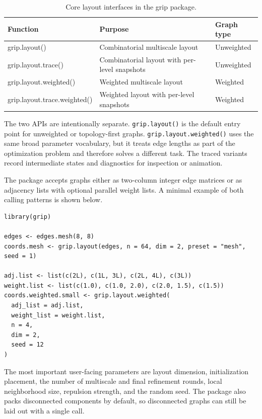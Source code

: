 \begin{table}

\caption{\label{tab:api-summary}Core layout interfaces in the grip package.}
\centering
\begin{tabular}[t]{l|l|l}
\hline
Function & Purpose & Graph type\\
\hline
grip.layout() & Combinatorial multiscale layout & Unweighted\\
\hline
grip.layout.trace() & Combinatorial layout with per-level snapshots & Unweighted\\
\hline
grip.layout.weighted() & Weighted multiscale layout & Weighted\\
\hline
grip.layout.trace.weighted() & Weighted layout with per-level snapshots & Weighted\\
\hline
\end{tabular}
\end{table}

The two APIs are intentionally separate. \texttt{grip.layout()} is the default entry
point for unweighted or topology-first graphs. \texttt{grip.layout.weighted()} uses
the same broad parameter vocabulary, but it treats edge lengths as part of the
optimization problem and therefore solves a different task. The traced variants
record intermediate states and diagnostics for inspection or animation.

The package accepts graphs either as two-column integer edge matrices or as
adjacency lists with optional parallel weight lists. A minimal example of both
calling patterns is shown below.

\begin{verbatim}
library(grip)

edges <- edges.mesh(8, 8)
coords.mesh <- grip.layout(edges, n = 64, dim = 2, preset = "mesh", seed = 1)

adj.list <- list(c(2L), c(1L, 3L), c(2L, 4L), c(3L))
weight.list <- list(c(1.0), c(1.0, 2.0), c(2.0, 1.5), c(1.5))
coords.weighted.small <- grip.layout.weighted(
  adj_list = adj.list,
  weight_list = weight.list,
  n = 4,
  dim = 2,
  seed = 12
)
\end{verbatim}

The most important user-facing parameters are layout dimension, initialization
placement, the number of multiscale and final refinement rounds, local
neighborhood size, repulsion strength, and the random seed. The package also
packs disconnected components by default, so disconnected graphs can still be
laid out with a single call.

